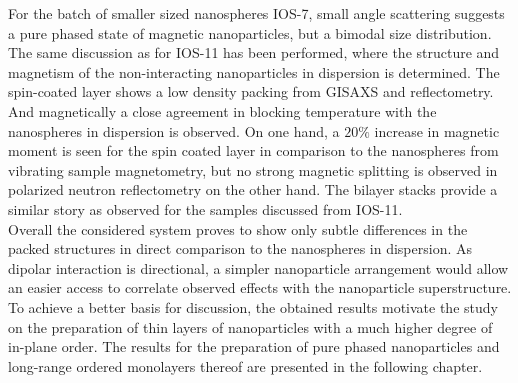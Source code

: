 \documentclass[\main/dresen_thesis.tex]{subfiles}
\begin{document}
  For the batch of smaller sized nanospheres IOS-7, small angle scattering suggests a pure phased state of magnetic nanoparticles, but a bimodal size distribution.
  The same discussion as for IOS-11 has been performed, where the structure and magnetism of the non-interacting nanoparticles in dispersion is determined.
  The spin-coated layer shows a low density packing from GISAXS and reflectometry. And magnetically a close agreement in blocking temperature with the nanospheres in dispersion is observed.
  On one hand, a $20 \%$ increase in magnetic moment is seen for the spin coated layer in comparison to the nanospheres from vibrating sample magnetometry, but no strong magnetic splitting is observed in polarized neutron reflectometry on the other hand.
  The bilayer stacks provide a similar story as observed for the samples discussed from IOS-11.
  \\

  Overall the considered system proves to show only subtle differences in the packed structures in direct comparison to the nanospheres in dispersion.
  As dipolar interaction is directional, a simpler nanoparticle arrangement would allow an easier access to correlate observed effects with the nanoparticle superstructure.
  To achieve a better basis for discussion, the obtained results motivate the study on the preparation of thin layers of nanoparticles with a much higher degree of in-plane order.
  The results for the preparation of pure phased nanoparticles and long-range ordered monolayers thereof are presented in the following chapter.
\end{document}
